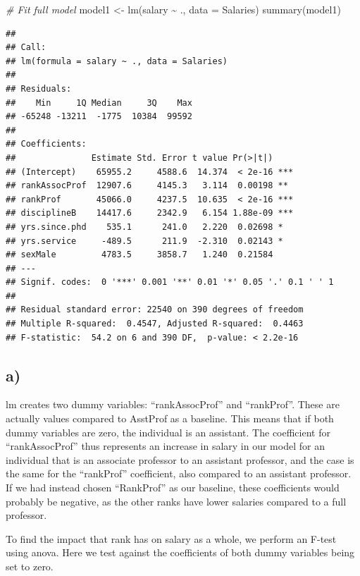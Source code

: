 \documentclass[
]{article}
\newenvironment{Shaded}{\begin{snugshade}}{\end{snugshade}}
\newcommand{\AttributeTok}[1]{\textcolor[rgb]{0.77,0.63,0.00}{#1}}
\newcommand{\CommentTok}[1]{\textcolor[rgb]{0.56,0.35,0.01}{\textit{#1}}}
\newcommand{\FunctionTok}[1]{\textcolor[rgb]{0.00,0.00,0.00}{#1}}
\newcommand{\NormalTok}[1]{#1}
\newcommand{\OtherTok}[1]{\textcolor[rgb]{0.56,0.35,0.01}{#1}}
\newcommand{\SpecialCharTok}[1]{\textcolor[rgb]{0.00,0.00,0.00}{#1}}
\begin{document}
\begin{Shaded}
\begin{Highlighting}[]
\CommentTok{\# Fit full model}
\NormalTok{model1 }\OtherTok{\textless{}{-}} \FunctionTok{lm}\NormalTok{(salary }\SpecialCharTok{\textasciitilde{}}\NormalTok{ ., }\AttributeTok{data =}\NormalTok{ Salaries)}
\FunctionTok{summary}\NormalTok{(model1)}
\end{Highlighting}
\end{Shaded}

\begin{verbatim}
## 
## Call:
## lm(formula = salary ~ ., data = Salaries)
## 
## Residuals:
##    Min     1Q Median     3Q    Max 
## -65248 -13211  -1775  10384  99592 
## 
## Coefficients:
##               Estimate Std. Error t value Pr(>|t|)    
## (Intercept)    65955.2     4588.6  14.374  < 2e-16 ***
## rankAssocProf  12907.6     4145.3   3.114  0.00198 ** 
## rankProf       45066.0     4237.5  10.635  < 2e-16 ***
## disciplineB    14417.6     2342.9   6.154 1.88e-09 ***
## yrs.since.phd    535.1      241.0   2.220  0.02698 *  
## yrs.service     -489.5      211.9  -2.310  0.02143 *  
## sexMale         4783.5     3858.7   1.240  0.21584    
## ---
## Signif. codes:  0 '***' 0.001 '**' 0.01 '*' 0.05 '.' 0.1 ' ' 1
## 
## Residual standard error: 22540 on 390 degrees of freedom
## Multiple R-squared:  0.4547, Adjusted R-squared:  0.4463 
## F-statistic:  54.2 on 6 and 390 DF,  p-value: < 2.2e-16
\end{verbatim}

\hypertarget{a-1}{%
\subsection{a)}\label{a-1}}

lm creates two dummy variables: ``rankAssocProf'' and ``rankProf''.
These are actually values compared to AsstProf as a baseline. This means
that if both dummy variables are zero, the individual is an assistant.
The coefficient for ``rankAssocProf'' thus represents an increase in
salary in our model for an individual that is an associate professor to
an assistant professor, and the case is the same for the ``rankProf''
coefficient, also compared to an assistant professor. If we had instead
chosen ``RankProf'' as our baseline, these coefficients would probably
be negative, as the other ranks have lower salaries compared to a full
professor.

To find the impact that rank has on salary as a whole, we perform an
F-test using anova. Here we test against the coefficients of both dummy
variables being set to zero.
\end{document}

